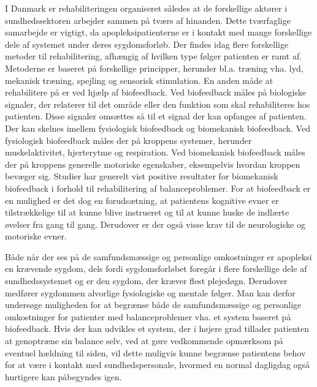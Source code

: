 I Danmark er rehabiliteringen organiseret således at de forskellige aktører i sundhedssektoren arbejder sammen på tværs af hinanden. Dette tværfaglige samarbejde er vigtigt, da apopleksipatienterne er i kontakt med mange forskellige dele af systemet under deres sygdomsforløb. 
Der findes idag flere forskellige metoder til rehabilitering, afhængig af hvilken type følger patienten er ramt af. Metoderne er baseret på forskellige principper, herunder bl.a. træning vha. lyd, mekanisk træning, spejling og sensorisk stimulation.
En anden måde at rehabilitere på er ved hjælp af biofeedback. Ved biofeedback måles på biologiske signaler, der relaterer til det område eller den funktion som skal rehabiliteres hos patienten. Disse signaler omsættes så til et signal der kan opfanges af patienten. Der kan skelnes imellem fysiologisk biofeedback og biomekanisk biofeedback. Ved fysiologisk biofeedback måles der på kroppens systemer, herunder muskelaktivitet, hjerterytme og respiration. Ved biomekanisk biofeedback måles der på kroppens generelle motoriske egenskaber, eksempelvis hvordan kroppen bevæger sig. Studier har generelt vist positive resultater for biomekanisk biofeedback i forhold til rehabilitering af balanceproblemer.
For at biofeedback er en mulighed er det dog en forudsætning, at patientens kognitive evner er tilstrækkelige til at kunne blive instrueret og til at kunne huske de indlærte øvelser fra gang til gang. Derudover er der også visse krav til de neurologiske og motoriske evner. 

Både når der ses på de samfundsmæssige og personlige omkostninger er apopleksi en krævende sygdom, dels fordi sygdomsforløbet foregår i flere forskellige dele af sundhedssystemet og er den sygdom, der kræver flest plejedøgn. Derudover medfører sygdommen alvorlige fysiologiske og mentale følger. 
Man kan derfor undersøge muligheden for at begrænse både de samfundsmæssige og personlige omkostninger for patienter med balanceproblemer vha. et system baseret på biofeedback. Hvis der kan udvikles et system, der i højere grad tillader patienten at genoptræne sin balance selv, ved at gøre vedkommende opmærksom på eventuel hældning til siden, vil dette muligvis kunne begrænse patientens behov for at være i kontakt med sundhedspersonale, hvormed en normal dagligdag også hurtigere kan påbegyndes igen.  